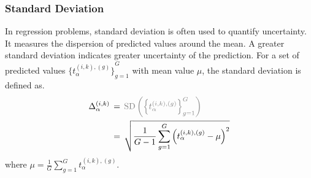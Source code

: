 \documentclass[sn-nature]{bst/sn-jnl}
\begin{document}
\subsubsection{Standard Deviation}
In regression problems, standard deviation is often used to quantify uncertainty. It measures the dispersion of predicted values around the mean. A greater standard deviation indicates greater uncertainty of the prediction. For a set of predicted values ${\{t_{\alpha}^{(i,k),(g)} \}}_{g=1}^G $ with mean value $\mu $, the standard deviation is defined as.
\begin{align}
\Delta_{\alpha}^{(i,k)}
\, & = \, \textcolor{gray}{\text{SD}\left({\left\{t_{\alpha}^{(i,k),(g)}\right\}}_{g=1}^G\right)} \\
\, & = \, \sqrt {\frac{1}{G-1}\sum_{g=1}^G {\left(t_{\alpha}^{(i,k),(g)}-\mu\right)}^2}
\label{eq:crowd.Eq.6.uncertainty.sd}
\end{align}
where $\mu=\frac{1}{G}\sum_{g=1}^{G}{t_{\alpha}^{(i,k),(g)}}$.
\end{document}
